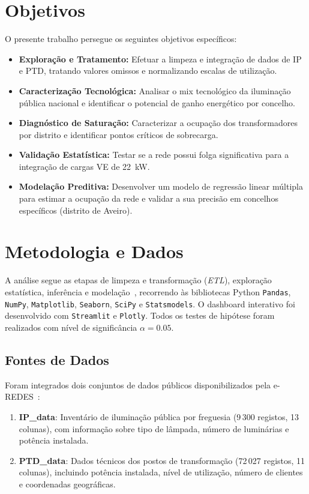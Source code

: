 \documentclass[conference]{IEEEtran}
\begin{document}
\section{Objetivos}
O presente trabalho persegue os seguintes objetivos específicos:
\begin{itemize}
    \item \textbf{Exploração e Tratamento:} Efetuar a limpeza e integração de dados de IP e PTD, tratando valores omissos e normalizando escalas de utilização.
    \item \textbf{Caracterização Tecnológica:} Analisar o mix tecnológico da iluminação pública nacional e identificar o potencial de ganho energético por concelho.
    \item \textbf{Diagnóstico de Saturação:} Caracterizar a ocupação dos transformadores por distrito e identificar pontos críticos de sobrecarga.
    \item \textbf{Validação Estatística:} Testar se a rede possui folga significativa para a integração de cargas VE de 22~kW.
    \item \textbf{Modelação Preditiva:} Desenvolver um modelo de regressão linear múltipla para estimar a ocupação da rede e validar a sua precisão em concelhos específicos (distrito de Aveiro).
\end{itemize}

\section{Metodologia e Dados}

A análise segue as etapas de limpeza e transformação (\textit{ETL}), exploração estatística, inferência e modelação~\cite{b2,b3}, recorrendo às bibliotecas Python \texttt{Pandas}, \texttt{NumPy}, \texttt{Matplotlib}, \texttt{Seaborn}, \texttt{SciPy} e \texttt{Statsmodels}. O dashboard interativo foi desenvolvido com \texttt{Streamlit} e \texttt{Plotly}. Todos os testes de hipótese foram realizados com nível de significância $\alpha = 0.05$.

\subsection{Fontes de Dados}

Foram integrados dois conjuntos de dados públicos disponibilizados pela e-REDES~\cite{b4}:

\begin{enumerate}
    \item \textbf{IP\_data}: Inventário de iluminação pública por freguesia (9\,300 registos, 13 colunas), com informação sobre tipo de lâmpada, número de luminárias e potência instalada.
    \item \textbf{PTD\_data}: Dados técnicos dos postos de transformação (72\,027 registos, 11 colunas), incluindo potência instalada, nível de utilização, número de clientes e coordenadas geográficas.
\end{enumerate}
\end{document}
